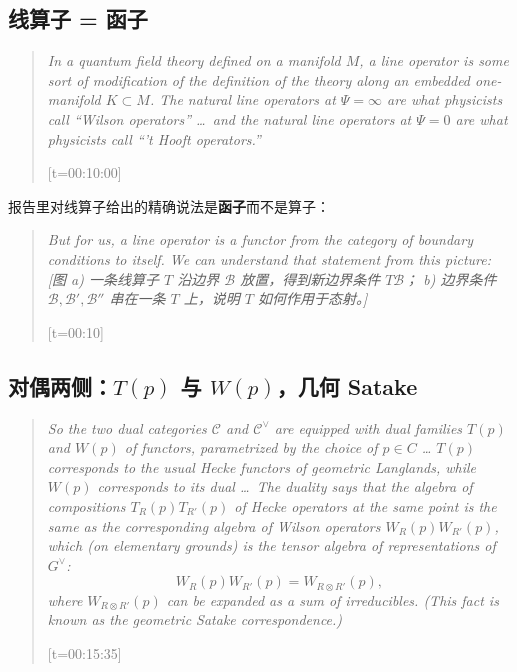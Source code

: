 \documentclass[11pt,a4paper]{ctexart}
\newcommand{\slq}[2]{%
  \begin{quote}\small\itshape #2\par
  \raggedleft\normalfont\footnotesize\textcolor{gray}{[t=#1]}\end{quote}}
\begin{document}
\subsection{线算子 = 函子}

\slq{00:10:00}{In a quantum field theory defined on a manifold $M$, a line operator is some sort of
modification of the definition of the theory along an embedded one-manifold $K\subset M$. The natural
line operators at $\Psi=\infty$ are what physicists call ``Wilson operators'' \dots\ and the natural
line operators at $\Psi=0$ are what physicists call ``'t Hooft operators.''}


报告里对线算子给出的精确说法是\textbf{函子}而不是算子：

\slq{00:10}{But for us, a line operator is a functor from the category of boundary conditions to itself.
We can understand that statement from this picture: [图 a) 一条线算子 $T$ 沿边界 $\mathcal{B}$ 放置，得到新边界条件 $T\mathcal{B}$；
b) 边界条件 $\mathcal{B},\mathcal{B}',\mathcal{B}''$ 串在一条 $T$ 上，说明 $T$ 如何作用于态射。]}


\subsection{对偶两侧：$T(p)$ 与 $W(p)$，几何 Satake}

\slq{00:15:35}{So the two dual categories $\mathcal{C}$ and $\mathcal{C}^{\vee}$ are equipped with dual
families $T(p)$ and $W(p)$ of functors, parametrized by the choice of $p\in C$ \dots
$T(p)$ corresponds to the usual Hecke functors of geometric Langlands, while $W(p)$ corresponds to
its dual \dots\ The duality says that the algebra of compositions $T_R(p)T_{R'}(p)$ of Hecke operators
at the same point is the same as the corresponding algebra of Wilson operators $W_R(p)W_{R'}(p)$,
which (on elementary grounds) is the tensor algebra of representations of $G^{\vee}$:
\[
W_R(p)W_{R'}(p)=W_{R\otimes R'}(p),
\]
where $W_{R\otimes R'}(p)$ can be expanded as a sum of irreducibles.
(This fact is known as the geometric Satake correspondence.)}
\end{document}
